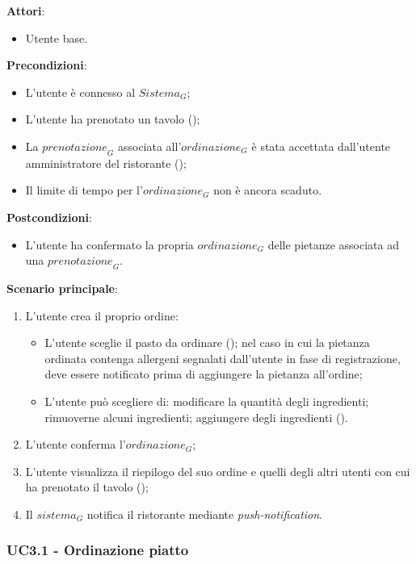 \textbf{Attori}:
\begin{itemize}
    \item Utente base.
\end{itemize}
\textbf{Precondizioni}:
\begin{itemize}
    \item L'utente è connesso al $\textit{Sistema}_G$; 
    \item L'utente ha prenotato un tavolo ();
    \item La $\textit{prenotazione}_G$ associata all'$\textit{ordinazione}_G$ è stata accettata dall'utente amministratore del ristorante ();
    \item Il limite di tempo per l'$\textit{ordinazione}_G$ non è ancora scaduto.
\end{itemize}
\textbf{Postcondizioni}:
\begin{itemize}
    \item L'utente ha confermato la propria $\textit{ordinazione}_G$ delle pietanze associata ad una $\textit{prenotazione}_G$.
\end{itemize}
\textbf{Scenario principale}:
\begin{enumerate}
    \item L'utente crea il proprio ordine:
    \begin{itemize}
    \item L'utente sceglie il pasto da ordinare (); nel caso in cui la pietanza ordinata contenga allergeni segnalati dall'utente in fase di registrazione, deve essere notificato prima di  aggiungere la pietanza all'ordine;
    \item L'utente può scegliere di: modificare la quantità degli ingredienti; rimuoverne alcuni ingredienti; aggiungere degli ingredienti ().
    \end{itemize}
    \item L'utente conferma l'$\textit{ordinazione}_G$;
    \item L'utente visualizza il riepilogo del suo ordine e quelli degli altri utenti con cui ha prenotato il tavolo ();
    \item Il $\textit{sistema}_G$ notifica il ristorante mediante \textit{push-notification}.
\end{enumerate}


\subsubsection{UC3.1 - Ordinazione piatto}\label{usecase:3_1}

